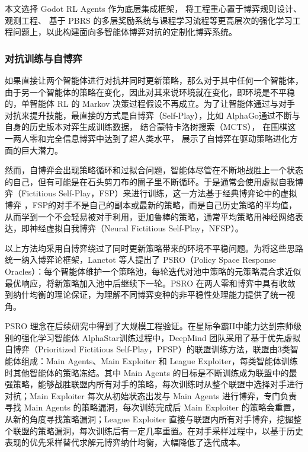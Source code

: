 \documentclass[12pt, a4paper, UTF8]{ctexart}
\numberwithin{equation}{section}
\begin{document}
本文选择 Godot RL Agents 作为底层集成框架，
将工程重心置于博弈规则设计、观测工程、
基于 PBRS 的多层奖励系统与课程学习流程等更高层次的强化学习工程问题上，以此构建面向多智能体博弈对抗的定制化博弈系统。

\subsubsection{对抗训练与自博弈}
如果直接让两个智能体进行对抗并同时更新策略，那么对于其中任何一个智能体，由于另一个智能体的策略在变化，因此对其来说环境就在变化，即环境是不平稳的，单智能体 RL 的 Markov 决策过程假设不再成立。为了让智能体通过与对手对抗来提升技能，最直接的方式是自博弈（Self-Play），比如
AlphaGo\cite{Silveralphago2016}通过不断与自身的历史版本对弈生成训练数据，
结合蒙特卡洛树搜索（MCTS），
在围棋这一两人零和完全信息博弈中达到了超人类水平，
展示了自博弈在驱动策略进化方面的巨大潜力。

然而，自博弈会出现策略循环和过拟合问题，智能体尽管在不断地战胜上一个状态的自己，但有可能是在石头剪刀布的圈子里不断循环。于是通常会使用虚拟自我博弈（Fictitious Self-Play，FSP）来进行训练，这一方法基于经典博弈论中的虚拟博弈\cite{brown1951fictitious} ，FSP的对手不是自己的副本或最新的策略，而是自己历史策略的平均值，从而学到一个不会轻易被对手利用，更加鲁棒的策略，通常平均策略用神经网络表达，即神经虚拟自我博弈（Neural Fictitious Self-Play，NFSP）\cite{heinrich2016deepreinforcementlearningselfplay}。

以上方法均采用自博弈绕过了同时更新策略带来的环境不平稳问题。为将这些思路统一纳入博弈论框架，Lanctot 等人提出了 PSRO（Policy Space Response Oracles）\cite{lanctot2017unifiedgametheoreticapproachmultiagent}：每个智能体维护一个策略池，每轮迭代对池中策略的元策略混合求近似最优响应，将新策略加入池中后继续下一轮。PSRO 在两人零和博弈中具有收敛到纳什均衡的理论保证，为理解不同博弈变种的非平稳性处理能力提供了统一视角。

PSRO 理念在后续研究中得到了大规模工程验证。在星际争霸II中能力达到宗师级别的强化学习智能体 AlphaStar\cite{VinyalsAlphaStar2019}训练过程中，DeepMind 团队采用了基于优先虚拟自博弈（Prioritized Fictitious Self-Play，PFSP）的联盟训练方法，联盟由3类智能体组成：Main Agents、Main Exploiter 和 League Exploiter，每类智能体训练时其他智能体的策略冻结。其中 Main Agents 的目标是不断训练成为联盟中的最强策略，能够战胜联盟内所有对手的策略，每次训练时从整个联盟中选择对手进行对抗；Main Exploiter 每次从初始状态出发与 Main Agents 进行博弈，专门负责寻找 Main Agents 的策略漏洞，每次训练完成后 Main Exploiter 的策略会重置，从新的角度寻找策略漏洞；League Exploiter 直接与联盟内所有对手博弈，挖掘整个联盟的策略漏洞，每次训练后有一定几率重置。在对手采样过程中，以基于历史表现的优先采样替代求解元博弈纳什均衡，大幅降低了迭代成本。
\end{document}
